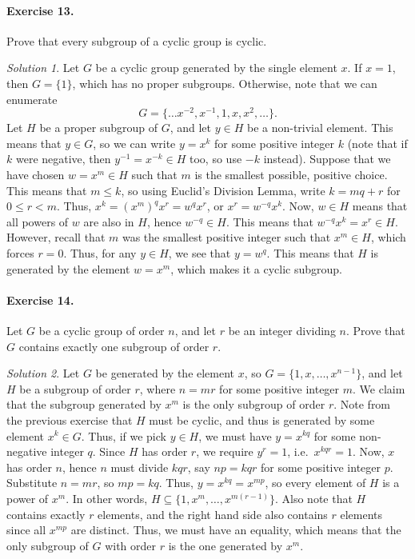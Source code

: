 \documentclass[11pt]{report}
\theoremstyle{remark}
\newtheorem*{solution}{Solution}
\begin{document}
    \paragraph{Exercise 13.} Prove that every subgroup of a cyclic group is cyclic.
    \begin{solution}
        Let $G$ be a cyclic group generated by the single element $x$. If $x = 1$,
        then $G = \{1\}$, which has no proper subgroups. Otherwise, note that we can
        enumerate \[
            G = \{\dots x^{-2}, x^{-1}, 1, x, x^2, \dots\}.
        \] Let $H$ be a proper subgroup of $G$, and let $y \in H$ be a non-trivial
        element. This means that $y \in G$, so we can write $y = x^k$ for some
        positive integer $k$ (note that if $k$ were negative, then $y^{-1} = x^{-k}
        \in H$ too, so use $-k$ instead). Suppose that we have chosen $w = x^m \in
        H$ such that $m$ is the smallest possible, positive choice. This means that
        $m \leq k$, so using Euclid's Division Lemma, write $k = mq + r$ for $0 \leq
        r < m$. Thus, $x^{k} = (x^m)^q x^r = w^qx^r$, or $x^r = w^{-q}x^k$. Now, $w
        \in H$ means that all powers of $w$ are also in $H$, hence $w^{-q} \in H$.
        This means that $w^{-q}x^k = x^r \in H$. However, recall that $m$ was the
        smallest positive integer such that $x^m \in H$, which forces $r = 0$. Thus,
        for any $y \in H$, we see that $y = w^q$. This means that $H$ is generated
        by the element $w = x^m$, which makes it a cyclic subgroup.
    \end{solution}

    \paragraph{Exercise 14.} Let $G$ be a cyclic group of order $n$, and let $r$ be
    an integer dividing $n$. Prove that $G$ contains exactly one subgroup of order
    $r$.
    \begin{solution}
        Let $G$ be generated by the element $x$, so $G = \{1, x, \dots, x^{n -
        1}\}$, and let $H$ be a subgroup of order $r$, where $n = mr$ for some
        positive integer $m$.  We claim that the subgroup generated by $x^m$ is the
        only subgroup of order $r$. Note from the previous exercise that $H$ must be
        cyclic, and thus is generated by some element $x^k \in G$. Thus, if we pick
        $y \in H$, we must have $y = x^{kq}$ for some non-negative integer $q$.
        Since $H$ has order $r$, we require $y^r = 1$, i.e.\ $x^{kqr} = 1$.
        Now, $x$ has order $n$, hence $n$ must divide $kqr$, say $np = kqr$ for some
        positive integer $p$. Substitute $n = mr$, so $mp = kq$. Thus, $y = x^{kq} =
        x^{mp}$, so every element of $H$ is a power of $x^m$. In other words, $H
        \subseteq \{1, x^m, \dots, x^{m(r - 1)}\}$. Also note that $H$ contains
        exactly $r$ elements, and the right hand side also contains $r$ elements
        since all $x^{mp}$ are distinct. Thus, we must have an equality, which means
        that the only subgroup of $G$ with order $r$ is the one generated by $x^m$.
    \end{solution}
\end{document}
